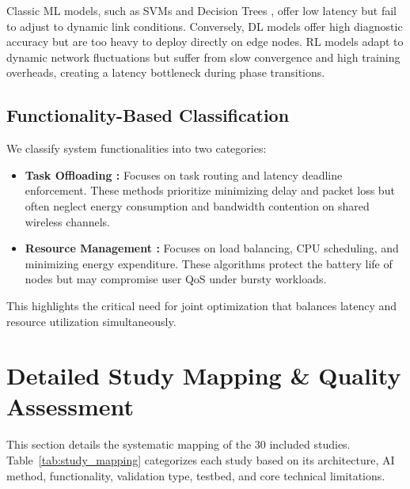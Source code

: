 \documentclass[conference]{IEEEtran}
\begin{document}
Classic ML models, such as SVMs and Decision Trees \cite{b7,b9}, offer low latency but fail to adjust to dynamic link conditions. Conversely, DL models \cite{b12} offer high diagnostic accuracy but are too heavy to deploy directly on edge nodes. RL models \cite{b3} adapt to dynamic network fluctuations but suffer from slow convergence and high training overheads, creating a latency bottleneck during phase transitions.

\subsection{Functionality-Based Classification}
We classify system functionalities into two categories:
\begin{itemize}
    \item \textbf{Task Offloading \cite{b3,b4,b11}:} Focuses on task routing and latency deadline enforcement. These methods prioritize minimizing delay and packet loss but often neglect energy consumption and bandwidth contention on shared wireless channels.
    \item \textbf{Resource Management \cite{b7,b9,b20,b25}:} Focuses on load balancing, CPU scheduling, and minimizing energy expenditure. These algorithms protect the battery life of nodes but may compromise user QoS under bursty workloads.
\end{itemize}

This highlights the critical need for joint optimization that balances latency and resource utilization simultaneously.

\section{Detailed Study Mapping \& Quality Assessment}
\label{sec:mapping}

This section details the systematic mapping of the 30 included studies. Table~\ref{tab:study_mapping} categorizes each study based on its architecture, AI method, functionality, validation type, testbed, and core technical limitations.
\end{document}
